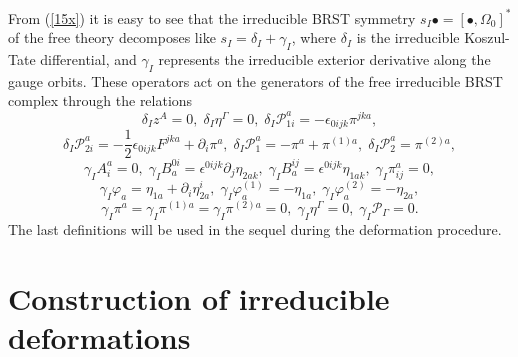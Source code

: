 \documentclass[a4paper,12pt]{article}
\begin{document}
From (\ref{15x}) it is easy to see that the irreducible BRST symmetry $%
s_{I}\bullet =\left[ \bullet ,\Omega _{0}\right] ^{*}$ of the free theory
decomposes like $s_{I}=\delta _{I}+\gamma _{I}$, where $\delta _{I}$ is the
irreducible Koszul-Tate differential, and $\gamma _{I}$ represents the
irreducible exterior derivative along the gauge orbits. These operators act
on the generators of the free irreducible BRST complex through the relations 
\begin{equation}
\delta _{I}z^{A}=0,\;\delta _{I}\eta ^{\Gamma }=0,\;\delta _{I}\mathcal{P}%
_{1i}^{a}=-\epsilon _{0ijk}\pi ^{jka},  \label{20x}
\end{equation}
\begin{equation}
\delta _{I}\mathcal{P}_{2i}^{a}=-\frac{1}{2}\epsilon _{0ijk}F^{jka}+\partial
_{i}\pi ^{a},\;\delta _{I}\mathcal{P}_{1}^{a}=-\pi ^{a}+\pi ^{(1)a},\;\delta
_{I}\mathcal{P}_{2}^{a}=\pi ^{(2)a},  \label{21x}
\end{equation}
\begin{equation}
\gamma _{I}A_{i}^{a}=0,\;\gamma _{I}B_{a}^{0i}=\epsilon ^{0ijk}\partial
_{j}\eta _{2ak},\;\gamma _{I}B_{a}^{ij}=\epsilon ^{0ijk}\eta _{1ak},\;\gamma
_{I}\pi _{ij}^{a}=0,  \label{22x}
\end{equation}
\begin{equation}
\gamma _{I}\varphi _{a}=\eta _{1a}+\partial _{i}\eta _{2a}^{i},\;\gamma
_{I}\varphi _{a}^{\left( 1\right) }=-\eta _{1a},\;\gamma _{I}\varphi
_{a}^{\left( 2\right) }=-\eta _{2a},  \label{23x}
\end{equation}
\begin{equation}
\gamma _{I}\pi ^{a}=\gamma _{I}\pi ^{(1)a}=\gamma _{I}\pi ^{(2)a}=0,\;\gamma
_{I}\eta ^{\Gamma }=0,\;\gamma _{I}\mathcal{P}_{\Gamma }=0.  \label{24x}
\end{equation}
The last definitions will be used in the sequel during the deformation
procedure.

\section{Construction of irreducible deformations}
\end{document}
